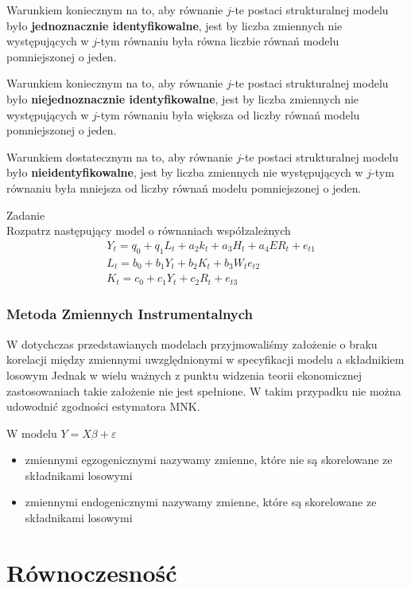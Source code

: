 \begin{twr}
	Warunkiem koniecznym na to, aby równanie $ j $-te postaci strukturalnej modelu było \textbf{jednoznacznie identyfikowalne}, jest by liczba zmiennych nie występujących w $ j $-tym równaniu była równa liczbie równań modelu pomniejszonej o jeden.
\end{twr}
\begin{twr}
	Warunkiem koniecznym na to, aby równanie $ j $-te postaci strukturalnej modelu było \textbf{niejednoznacznie identyfikowalne}, jest by liczba zmiennych nie występujących w $ j $-tym równaniu była większa od liczby równań modelu pomniejszonej o jeden.
\end{twr}
\begin{twr}
	Warunkiem dostatecznym na to, aby równanie $ j $-te postaci strukturalnej modelu było \textbf{nieidentyfikowalne}, jest by liczba zmiennych nie występujących w $ j $-tym równaniu była mniejsza od liczby równań modelu pomniejszonej o jeden.
\end{twr}

Zadanie\\
Rozpatrz następujący model o równaniach współzależnych
\begin{align*}
&Y_t=q_0+q_1L_t+a_2k_t+a_3H_t+a_4ER_t+e_{t1}\\
&L_t=b_0+b_1Y_t+b_2K_t+b_3W_te_{t2}\\
&K_t=c_0+c_1Y_t+c_2R_t+e_{t3}
\end{align*}

\subsubsection{Metoda Zmiennych Instrumentalnych}
W dotychczas przedstawianych modelach przyjmowaliśmy założenie o braku korelacji między zmiennymi uwzględnionymi w specyfikacji modelu a składnikiem losowym Jednak w wielu ważnych z punktu widzenia teorii ekonomicznej zastosowaniach takie założenie nie jest spełnione. W takim przypadku nie można udowodnić zgodności estymatora MNK.

W modelu $ Y=X\beta+\varepsilon $
\begin{itemize}
	\item zmiennymi egzogenicznymi nazywamy zmienne, które nie są skorelowane ze składnikami losowymi
	\item zmiennymi endogenicznymi nazywamy zmienne, które są skorelowane ze składnikami losowymi
\end{itemize}

\section{Równoczesność}

